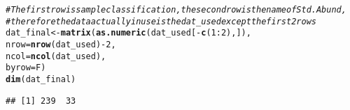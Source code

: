 \documentclass{article}\usepackage[]{graphicx}\usepackage[]{color}
\makeatletter
\newcommand{\hlnum}[1]{\textcolor[rgb]{0.686,0.059,0.569}{#1}}%
\newcommand{\hlcom}[1]{\textcolor[rgb]{0.678,0.584,0.686}{\textit{#1}}}%
\newcommand{\hlopt}[1]{\textcolor[rgb]{0,0,0}{#1}}%
\newcommand{\hlstd}[1]{\textcolor[rgb]{0.345,0.345,0.345}{#1}}%
\newcommand{\hlkwb}[1]{\textcolor[rgb]{0.69,0.353,0.396}{#1}}%
\newcommand{\hlkwc}[1]{\textcolor[rgb]{0.333,0.667,0.333}{#1}}%
\newcommand{\hlkwd}[1]{\textcolor[rgb]{0.737,0.353,0.396}{\textbf{#1}}}%
\newenvironment{kframe}{%
 \def\at@end@of@kframe{}%
 \ifinner\ifhmode%
  \def\at@end@of@kframe{\end{minipage}}%
  \begin{minipage}{\columnwidth}%
 \fi\fi%
 \def\FrameCommand##1{\hskip\@totalleftmargin \hskip-\fboxsep
 \colorbox{shadecolor}{##1}\hskip-\fboxsep
     \hskip-\linewidth \hskip-\@totalleftmargin \hskip\columnwidth}%
 \MakeFramed {\advance\hsize-\width
   \@totalleftmargin\z@ \linewidth\hsize
   \@setminipage}}%
 {\par\unskip\endMakeFramed%
 \at@end@of@kframe}
\newenvironment{knitrout}{}{} %
\makeatother
\begin{document}
\begin{knitrout}
\color{fgcolor}\begin{kframe}
\begin{alltt}
\hlcom{# The first row is sample  classification, the second row is the name of Std. Abund, }
\hlcom{# therefore the data actually in use is the dat_used except the first 2 rows}
\hlstd{dat_final} \hlkwb{<-} \hlkwd{matrix}\hlstd{(}\hlkwd{as.numeric}\hlstd{(dat_used[}\hlopt{-}\hlkwd{c}\hlstd{(}\hlnum{1}\hlopt{:}\hlnum{2}\hlstd{),]),}
                    \hlkwc{nrow} \hlstd{=} \hlkwd{nrow}\hlstd{(dat_used)}\hlopt{-}\hlnum{2}\hlstd{,}
                    \hlkwc{ncol} \hlstd{=} \hlkwd{ncol}\hlstd{(dat_used),}
                    \hlkwc{byrow} \hlstd{= F)}
\hlkwd{dim}\hlstd{(dat_final)}
\end{alltt}
\begin{verbatim}
## [1] 239  33
\end{verbatim}
\begin{alltt}


\end{alltt}
\end{kframe}
\end{knitrout}
\end{document}
